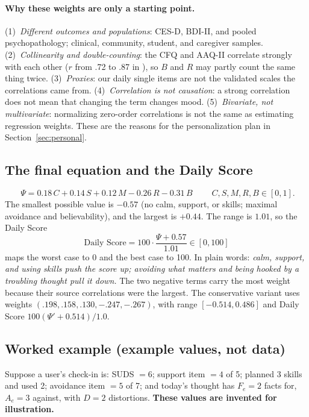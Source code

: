 \documentclass[11pt]{article}
\begin{document}
\paragraph{Why these weights are only a starting point.}
(1)~\emph{Different outcomes and populations}: CES-D, BDI-II, and pooled psychopathology; clinical, community, student, and caregiver samples. (2)~\emph{Collinearity and double-counting}: the CFQ and AAQ-II correlate strongly with each other ($r$ from .72 to .87 in \citealp{gillanders2014}), so $B$ and $R$ may partly count the same thing twice. (3)~\emph{Proxies}: our daily single items are not the validated scales the correlations came from. (4)~\emph{Correlation is not causation}: a strong correlation does not mean that changing the term changes mood. (5)~\emph{Bivariate, not multivariate}: normalizing zero-order correlations is not the same as estimating regression weights. These are the reasons for the personalization plan in Section~\ref{sec:personal}.

\subsection{The final equation and the Daily Score}
\begin{equation}
\boxed{\;\Psi = 0.18\,C + 0.14\,S + 0.12\,M - 0.26\,R - 0.31\,B\;}\qquad C,S,M,R,B\in[0,1].
\label{eq:psi}
\end{equation}
The smallest possible value is $-0.57$ (no calm, support, or skills; maximal avoidance and believability), and the largest is $+0.44$. The range is $1.01$, so the Daily Score
\begin{equation}
\text{Daily Score} = 100\cdot\frac{\Psi + 0.57}{1.01} \in [0, 100]
\label{eq:daily}
\end{equation}
maps the worst case to 0 and the best case to 100. In plain words: \emph{calm, support, and using skills push the score up; avoiding what matters and being hooked by a troubling thought pull it down.} The two negative terms carry the most weight because their source correlations were the largest. The conservative variant uses weights $(.198, .158, .130, -.247, -.267)$, with range $[-0.514, 0.486]$ and Daily Score $100(\Psi' + 0.514)/1.0$.

\subsection{Worked example (example values, not data)}
Suppose a user's check-in is: SUDS $=6$; support item $=4$ of 5; planned 3 skills and used 2; avoidance item $=5$ of 7; and today's thought has $F_e=2$ facts for, $A_e=3$ against, with $D=2$ distortions. \textbf{These values are invented for illustration.}
\end{document}
